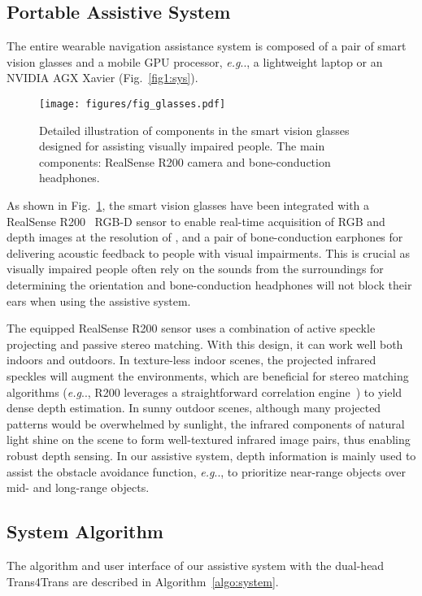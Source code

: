 \documentclass[journal]{IEEEtran}
\makeatletter
\DeclareRobustCommand\onedot{\futurelet\@let@token\@onedot}
\def\@onedot{\ifx\@let@token.\else.\null\fi\xspace}
\def\eg{\emph{e.g}\onedot} \def\Eg{\emph{E.g}\onedot}
\makeatother
\begin{document}
\subsection{Portable Assistive System}

The entire wearable navigation assistance system is composed of a pair of smart vision glasses and a mobile GPU processor, \eg, a lightweight laptop or an NVIDIA AGX Xavier (Fig.~\ref{fig1:sys}).

\begin{figure}[t]
    \centering
    \texttt{[image: figures/fig\_glasses.pdf]}
\caption{\small Detailed illustration of components in the smart vision glasses designed for assisting visually impaired people. The main components: RealSense R200 camera and bone-conduction headphones.}
    \label{fig:glasses}
\end{figure}

As shown in Fig.~\ref{fig:glasses}, the smart vision glasses have been integrated with a RealSense R200~\cite{keselman2017intel} RGB-D sensor to enable real-time acquisition of RGB and depth images at the resolution of , and a pair of bone-conduction earphones for delivering acoustic feedback to people with visual impairments. This is crucial as visually impaired people often rely on the sounds from the surroundings for determining the orientation and bone-conduction headphones will not block their ears when using the assistive system. 

The equipped RealSense R200 sensor uses a combination of active speckle projecting and passive stereo matching. With this design, it can work well both indoors and outdoors. In texture-less indoor scenes, the projected infrared speckles will augment the environments, which are beneficial for stereo matching algorithms (\eg, R200 leverages a straightforward correlation engine~\cite{keselman2017intel}) to yield dense depth estimation. In sunny outdoor scenes, although many projected patterns would be overwhelmed by sunlight, the infrared components of natural light shine on the scene to form well-textured infrared image pairs, thus enabling robust depth sensing. In our assistive system, depth information is mainly used to assist the obstacle avoidance function, \eg, to prioritize near-range objects over mid- and long-range objects.

\subsection{System Algorithm}\label{sec:sys_algo}
The algorithm and user interface of our assistive system with the dual-head Trans4Trans are described in Algorithm~\ref{algo:system}.
\end{document}

